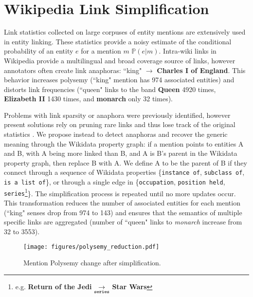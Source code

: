 \documentclass[letterpaper]{article}
\begin{document}

\section{Wikipedia Link Simplification}
\label{para:anaphora}
Link statistics collected on large corpuses of entity mentions are extensively used in entity linking. These statistics provide a noisy estimate of the conditional probability of an entity $e$ for a mention $m$ $\mathbb P(e | m)$. Intra-wiki links in Wikipedia provide a multilingual and broad coverage source of links, however annotators often create link anaphoras: ``king" $\to$ \textbf{Charles I of England}. This behavior increases polysemy (``king" mention has 974 associated entities) and distorts link frequencies (``queen" links to the band \textbf{Queen} 4920 times, \textbf{Elizabeth II} 1430 times, and \textbf{monarch} only 32 times).

Problems with link sparsity or anaphora were previously identified, however present solutions rely on pruning rare links and thus lose track of the original statistics \cite{tagme,hasibi2016reproducibility,ling2015design}. We propose instead to detect anaphoras and recover the generic meaning through the Wikidata property graph: if a mention points to entities A and B, with A being more linked than B, and A is B's parent in the Wikidata property graph, then replace B with A. We define A to be the parent of B if they connect through a sequence of Wikidata properties \{{\tt instance of}, {\tt subclass of}, {\tt is a list of}\}, or through a single edge in \{{\tt occupation}, {\tt position held}, {\tt series}\footnote{e.g. \textbf{Return of the Jedi} $\underset{\text{\tt series}}{\to}$ \textbf{Star Wars}}\}. The simplification process is repeated until no more updates occur. This transformation reduces the number of associated entities for each mention (``king" senses drop from 974 to 143) and ensures that the semantics of multiple specific links are aggregated (number of ``queen" links to {\em monarch} increase from 32 to 3553).
\begin{figure}[ht]
\centering
\texttt{[image: figures/polysemy\_reduction.pdf]}
\caption{Mention Polysemy change after simplification.}
\label{fig:polysemy}
\end{figure}
\end{document}
